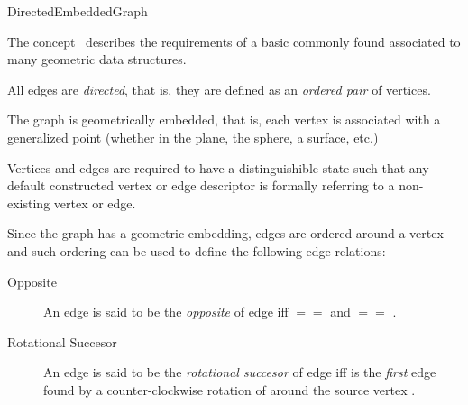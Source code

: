 
\begin{ccRefConcept}{DirectedEmbeddedGraph}


\ccDefinition

The concept \ccRefName\ describes the requirements of a basic
commonly found associated to many geometric data structures.


All edges are {\em directed}, that is, they are defined as an {\em ordered pair} 
of vertices.

The graph is geometrically embedded, that is, each vertex is associated with
 a generalized point (whether in the plane, the sphere, a surface, etc.)

Vertices and edges are required to have a distinguishible  state 
such that any default constructed vertex or edge descriptor is formally
referring to a non-existing vertex or edge.

Since the graph has a geometric embedding, edges are ordered around a vertex 
and such ordering can be used to define the following edge relations:

\begin{description}

\item[Opposite] 
An edge  is said to be the {\em opposite} of edge  
iff  $==$  and  $==$ .

\item[Rotational Succesor] 
An edge  is said to be the {\em rotational succesor} 
of edge  iff  is the {\em first} edge found by 
a counter-clockwise rotation of  around the source vertex .
 

\end{description}
\end{ccRefConcept}
